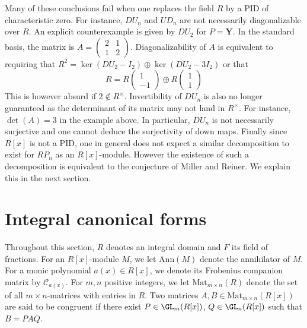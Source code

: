 Many of  these conclusions fail when one replaces the field %
$ R $ by  a PID of characteristic zero. For instance, $  DU_{n} $ and $ UD_{n} $ are not necessarily diagonalizable over $ R $.  An explicit  counterexample is given by $ DU_{2} $ for $ P         =    \mathbf{Y}   $. In the standard basis, the matrix  is $ A = \left ( \begin{smallmatrix} 2  & 1  \\ 1  &  2          \end{smallmatrix}   \right ) $.   Diagonalizability of $ A $ is equivalent to requiring  that $ R^{2} =  \ker (DU_{2} - I_{2}) \oplus \ker ( DU_{2} - 3I_{2}) $ or that  
$$    R  =   R \left ( \begin{smallmatrix}    1 \\  - 1 \end{smallmatrix} \right ) \oplus  R \left ( \begin{smallmatrix} 1 \\  1  \end{smallmatrix} \right  )  $$
This is however absurd if $ 2 \notin R^{\times }$.  Invertibility of $ DU_{n} $ is also no longer guaranteed as the determinant of its matrix may not land in $ R^{\times} $.  For instance,  $ \det(A) = 3 $ in the example above. In particular, $ DU_{n} $ is not necessarily surjective and one cannot deduce the surjectivity of down maps.   Finally since $ R[x] $ is not a PID, one in general does not expect a similar decomposition to exist for $  R P_{n} $ %
as an $ R[x]$-module.  However the existence of such a decomposition is equivalent to the conjecture of Miller and Reiner. We explain this in the next section.                                                   


\section{Integral canonical forms}

Throughout this section,  $ R $ denotes an integral domain and $ F $ its field of fractions. For an $ R[x] $-module $ M $, we let  $ \mathrm{Ann}(M) $ denote  the annihilator of $ M $. For a monic polynomial $ a(x) \in R[x] $, we denote its Frobenius companion matrix by $  \mathcal{C}_{a(x)}  $. For $ m , n $ positive integers, we let $ \mathrm{Mat}_{m \times n }(R) $   denote the set of all $ m \times n $-matrices with entries in $ R $. Two matrices $ A , B \in \mathrm{Mat}_{m \times n }(R[x]) $ are said to be congruent if there exist $ P \in \GL_{m}(R[x]) $, $ Q \in \GL_{n}(R[x]) $ such that $ B =  P A Q $. 

